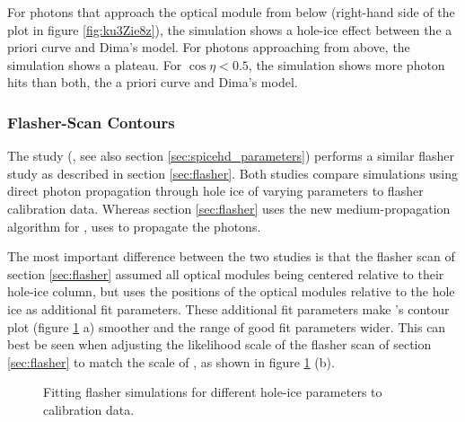 For photons that approach the optical module from below (right-hand side of the plot in figure \ref{fig:ku3Zie8z}), the simulation shows a hole-ice effect between the a priori curve and Dima's model. For photons approaching from above, the simulation shows a plateau. For $\cos\eta < 0.5$, the simulation shows more photon hits than both, the a priori curve and Dima's model.


\subsubsection{ Flasher-Scan Contours}
\label{sec:spicehd_flasher_scan_contours}

The  study (, see also section \ref{sec:spicehd_parameters}) performs a similar flasher study as described in section \ref{sec:flasher}.
Both studies compare simulations using direct photon propagation through hole ice of varying parameters to flasher calibration data. Whereas section \ref{sec:flasher} uses the new medium-propagation algorithm for \clsim,  uses \ppc to propagate the photons. \cite{martinspicehddard}

The most important difference between the two studies is that the flasher scan of section \ref{sec:flasher} assumed all optical modules being centered relative to their hole-ice column, but  uses the positions of the optical modules relative to the hole ice as additional fit parameters. These additional fit parameters make 's contour plot (figure \ref{fig:ahCoHee4} a) smoother and the range of good fit parameters wider. This can best be seen when adjusting the likelihood scale of the flasher scan of section \ref{sec:flasher} to match the scale of , as shown in figure \ref{fig:ahCoHee4} (b).

\begin{figure}[htbp]
  \hfill
  \caption{Fitting flasher simulations for different hole-ice parameters to calibration data.}
  \label{fig:ahCoHee4}
\end{figure}

